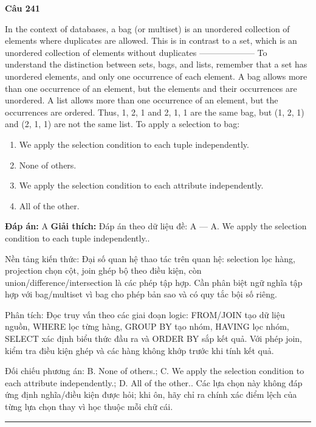 \documentclass[11pt,a4paper]{article}
\newenvironment{question}[1]{%
  \par\vspace{1em}\noindent\textbf{\large Câu #1}\par\vspace{0.4em}
}{%
  \par\vspace{1em}\hrule\vspace{0.6em}
}
\newenvironment{choices}{%
  \begin{enumerate}[label=\textbf{\Alph*.},leftmargin=2.2em,itemsep=2pt,topsep=3pt]
}{%
  \end{enumerate}
}
\newcommand{\choice}{\item}
\begin{document}
\begin{question}{241}
In the context of databases, a bag (or multiset) is an unordered collection of elements where duplicates are allowed. This is in contrast to a set, which is an unordered collection of elements without duplicates
--------------------
To understand the distinction between sets, bags, and lists, remember that a set has unordered elements, and only one occurrence of each element. A bag allows more than one occurrence of an element, but the elements and their occurrences are unordered. A list allows more than one occurrence of an element, but the occurrences are ordered. Thus, {1, 2, 1} and {2, 1, 1} are the same bag, but (1, 2, 1) and (2, 1, 1) are not the same list.
To apply a selection to bag:
\begin{choices}
\choice We apply the selection condition to each tuple independently.
\choice None of others.
\choice We apply the selection condition to each attribute independently.
\choice All of the other.
\end{choices}
\textbf{Đáp án:} A
\textbf{Giải thích:} Đáp án theo dữ liệu đề: A — A. We apply the selection condition to each tuple independently..

Nền tảng kiến thức: Đại số quan hệ thao tác trên quan hệ: selection lọc hàng, projection chọn cột, join ghép bộ theo điều kiện, còn union/difference/intersection là các phép tập hợp. Cần phân biệt ngữ nghĩa tập hợp với bag/multiset vì bag cho phép bản sao và có quy tắc bội số riêng.

Phân tích: Đọc truy vấn theo các giai đoạn logic: FROM/JOIN tạo dữ liệu nguồn, WHERE lọc từng hàng, GROUP BY tạo nhóm, HAVING lọc nhóm, SELECT xác định biểu thức đầu ra và ORDER BY sắp kết quả. Với phép join, kiểm tra điều kiện ghép và các hàng không khớp trước khi tính kết quả.

Đối chiếu phương án: B. None of others.; C. We apply the selection condition to each attribute independently.; D. All of the other.. Các lựa chọn này không đáp ứng định nghĩa/điều kiện được hỏi; khi ôn, hãy chỉ ra chính xác điểm lệch của từng lựa chọn thay vì học thuộc mỗi chữ cái.
\end{question}
\end{document}
